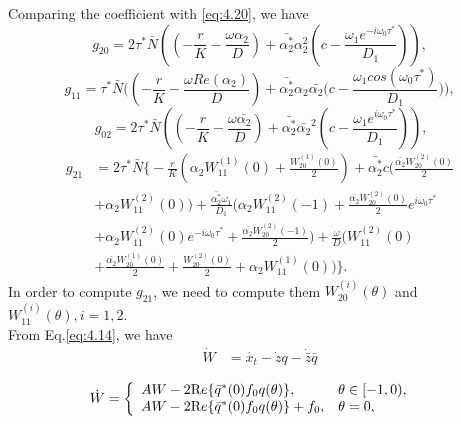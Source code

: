 \documentclass[10pt]{amsart}
\theoremstyle{definition}
\begin{document}
Comparing the coefficient with \eqref{eq:4.20}, we have
\begin{equation}\label{eq:4.18}
g_{20}=2\tau^* \bar N \left(\left(-\frac{r}{K}-\frac{\omega \alpha_2}{D}\right)+\bar{\alpha_2^*}\alpha_2^2\left(c-\frac{ \omega_1 e^{-i\omega_0 \tau^*}}{D_1}\right)\right),
\end{equation}
\begin{equation}\label{eq:4.19}
g_{11}=\tau^* \bar N \Bigg(\left(-\frac{r}{K}-\frac{\omega Re(\alpha_2)}{D}\right)+\bar{\alpha_2^*} \alpha_2 \bar{\alpha_2}\Bigg(c-\frac{ \omega_1 cos(\omega_0 \tau^*)}{D_1}\Bigg)\Bigg),
\end{equation}
\begin{equation}\label{eq:4.20}
~g_{02}=2\tau^* \bar N \left(\left(-\frac{r}{K}-\frac{\omega \bar{\alpha_2}}{D}\right)+\bar{\alpha_2^*} \bar{\alpha_2}^2 \left(c-\frac{ \omega_1 e^{i\omega_0 \tau^*}}{D_1}\right)\right),
\end{equation}
\begin{align}\label{eq:4.21}
g_{21}&=2\tau^* \bar N\Bigg\{-\frac{r}{K}(\alpha_2  W_{11}^{(1)} (0)+ \frac{W_{20}^{(1)} (0)}{2})+\bar{\alpha_2^*}c(\frac{\bar{\alpha_2}W_{20}^{(2)} (0)}{2}\\
&+\alpha_2 W_{11}^{(2)} (0))+\frac{\bar{\alpha_2^*} \omega_1}{D_1}(\alpha_2 W_{11}^{(2)} (-1)+\frac{\bar{\alpha_2} W_{20}^{(2)} (0)}{2}e^{i \omega_0 \tau^*}\nonumber\\
&+\alpha_2 W_{11}^{(2)} (0) e^{-i \omega_0 \tau^*}+\frac{\bar{\alpha_2}W_{20}^{(2)} (-1)}{2})+ \frac{\omega}{D}(W_{11}^{(2)} (0)\nonumber\\
&+\frac{\bar{\alpha_2}W_{20}^{(1)} (0)}{2}+\frac{W_{20}^{(2)} (0)}{2}+\alpha_2W_{11}^{(1)} (0))\Bigg\}.\nonumber
\end{align}
In order to compute $g_{21}$, we need to compute them $W_{20}^{(i)}(\theta)$ and $W_{11}^{(i)}(\theta), i=1,2$.\\
From Eq.\eqref{eq:4.14}, we have
\begin{align*}
\dot{W} &= \dot{x_{t}} - \dot{z}q - \dot{\bar{z}}\bar{q}\\
\end{align*}
\begin{align}\label{eq:4.22}
\dot{W}&= \left\{\begin{array}{ll}
A W - 2 {\mbox Re} \{{\bar{q}}^* (0) f_{0} q(\theta)\}, & \theta \in [-1,0), \\
A W - 2 {\mbox Re} \{{\bar{q}}^* (0) f_{0} q(\theta)\} + f_{0}, & \theta = 0,
\end{array}\right.
\end{align}
\end{document}
